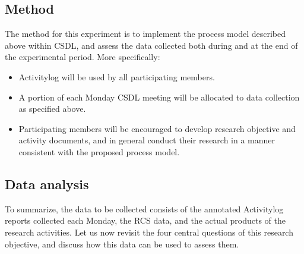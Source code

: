 \subsection{Method}

The method for this experiment is to implement the process model described
above within CSDL, and assess the data collected both during and at the end of the
experimental period.  More specifically:

\begin{itemize}
\item Activitylog will be used by all participating members.
\item A portion of each Monday CSDL meeting will be allocated to data
collection as specified above.
\item Participating members will be encouraged to develop research
  objective and activity documents, and in general conduct their research
  in a manner consistent with the proposed process model.
\end{itemize}


\subsection{Data analysis}

To summarize, the data to be collected consists of the annotated
Activitylog reports collected each Monday, the RCS data, and the actual
products of the research activities.  Let us now revisit the four central
questions of this research objective, and discuss how this data can be
used to assess them.

